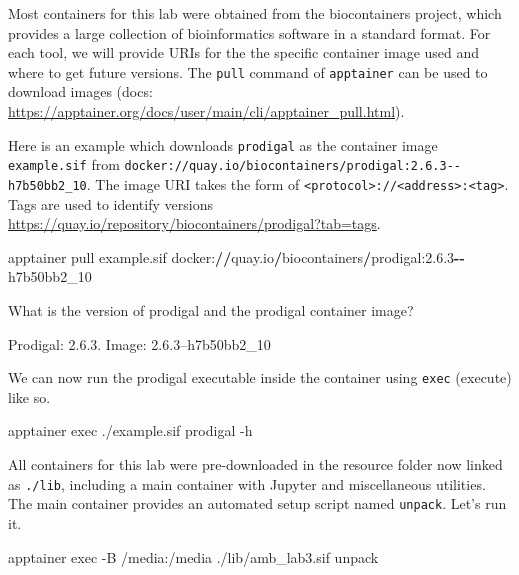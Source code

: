 \documentclass[
]{book}
\newenvironment{Shaded}{\begin{snugshade}}{\end{snugshade}}
\newcommand{\AttributeTok}[1]{\textcolor[rgb]{0.13,0.29,0.53}{#1}}
\newcommand{\ExtensionTok}[1]{#1}
\newcommand{\FloatTok}[1]{\textcolor[rgb]{0.00,0.00,0.81}{#1}}
\newcommand{\NormalTok}[1]{#1}
\newcommand{\OperatorTok}[1]{\textcolor[rgb]{0.81,0.36,0.00}{\textbf{#1}}}
\begin{document}
Most containers for this lab were obtained from the biocontainers project, which provides a large collection of bioinformatics software in a standard format.
For each tool, we will provide URIs for the the specific container image used and where to get future versions.
The \texttt{pull} command of \texttt{apptainer} can be used to download images (docs: \url{https://apptainer.org/docs/user/main/cli/apptainer_pull.html}).

Here is an example which downloads \texttt{prodigal} as the container image \texttt{example.sif} from \texttt{docker://quay.io/biocontainers/prodigal:2.6.3-\/-h7b50bb2\_10}.
The image URI takes the form of \texttt{\textless{}protocol\textgreater{}://\textless{}address\textgreater{}:\textless{}tag\textgreater{}}. Tags are used to identify versions \url{https://quay.io/repository/biocontainers/prodigal?tab=tags}.

\begin{Shaded}
\begin{Highlighting}[numbers=left,,]
\NormalTok{apptainer pull example.sif docker:}\OperatorTok{//}\NormalTok{quay.io}\OperatorTok{/}\NormalTok{biocontainers}\OperatorTok{/}\NormalTok{prodigal:}\FloatTok{2.6.3}\OperatorTok{{-}{-}}\NormalTok{h7b50bb2\_10}
\end{Highlighting}
\end{Shaded}

What is the version of prodigal and the prodigal container image?

Prodigal: 2.6.3. Image: 2.6.3--h7b50bb2\_10

We can now run the prodigal executable inside the container using \texttt{exec} (execute) like so.

\begin{Shaded}
\begin{Highlighting}[]
\ExtensionTok{apptainer}\NormalTok{ exec ./example.sif prodigal }\AttributeTok{{-}h}
\end{Highlighting}
\end{Shaded}

All containers for this lab were pre-downloaded in the resource folder now linked as \texttt{./lib}, including a main container with Jupyter and miscellaneous utilities.
The main container provides an automated setup script named \texttt{unpack}. Let's run it.

\begin{Shaded}
\begin{Highlighting}[]
\ExtensionTok{apptainer}\NormalTok{ exec }\AttributeTok{{-}B}\NormalTok{ /media:/media ./lib/amb\_lab3.sif unpack}
\end{Highlighting}
\end{Shaded}
\end{document}
